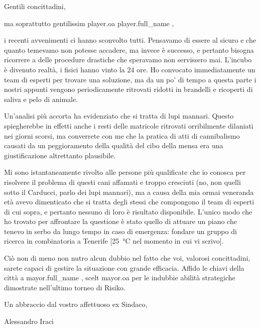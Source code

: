 \documentclass{letter}
\date{28 febbraio 2018}
\begin{document}
\begin{letter}{}
\opening{Gentili concittadini,}

ma soprattutto gentilissim{{ player.oa }} {{ player.full_name }},

i recenti avvenimenti ci hanno sconvolto tutti. Pensavamo di essere al sicuro e che quanto temevamo non potesse accadere, ma invece è successo, e pertanto bisogna ricorrere a delle procedure drastiche che speravamo non servissero mai. L'incubo è divenuto realtà, i fisici hanno vinto la 24 ore. Ho convocato immediatamente un team di esperti per trovare una soluzione, ma da un po' di tempo a questa parte i nostri appunti vengono periodicamente ritrovati ridotti in brandelli e ricoperti di saliva e pelo di animale.

Un'analisi più accorta ha evidenziato che si tratta di lupi mannari. Questo spiegherebbe in effetti anche i resti delle matricole ritrovati orribilmente dilaniati nei giorni scorsi, ma converrete con me che la pratica di atti di cannibalismo causati da un peggioramento della qualità del cibo della mensa era una giustificazione altrettanto plausibile.

Mi sono istantaneamente rivolto alle persone più qualificate che io conosca per risolvere il problema di questi cani affamati e troppo cresciuti (no, non quelli sotto il Carducci, parlo dei lupi mannari), ma a causa della mia ormai veneranda età avevo dimenticato che si tratta degli stessi che compongono il team di esperti di cui sopra, e pertanto nessuno di loro è risultato disponibile. L'unico modo che ho trovato per affrontare la questione è stato quello di attuare un piano che tenevo in serbo da lungo tempo in caso di emergenza: fondare un gruppo di ricerca in combinatoria a Tenerife [\SI{25}{\celsius} nel momento in cui vi scrivo].

Ciò non di meno non nutro alcun dubbio nel fatto che voi, valorosi concittadini, sarete capaci di gestire la situazione con grande efficacia. Affido le chiavi della città a {{ mayor.full_name }}, scelt{{ mayor.oa }} per le indubbie abilità strategiche dimostrate nell'ultimo torneo di Risiko.

Un abbraccio dal vostro affettuoso ex Sindaco,

\bigskip

\noindent Alessandro Iraci

\end{letter}
\end{document}

